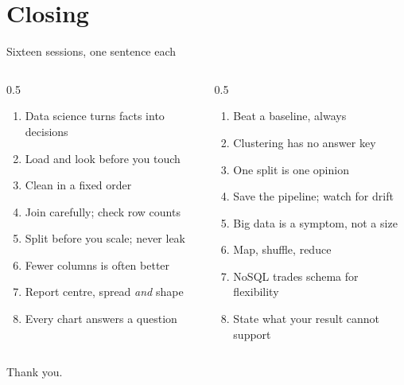 \documentclass[10pt,aspectratio=169]{beamer}
\begin{document}
\section*{Closing}

\begin{frame}{Sixteen sessions, one sentence each}
\begin{columns}[T]
\begin{column}{0.5\textwidth}
\begin{enumerate}\footnotesize
\item Data science turns facts into decisions
\item Load and look before you touch
\item Clean in a fixed order
\item Join carefully; check row counts
\item Split before you scale; never leak
\item Fewer columns is often better
\item Report centre, spread \emph{and} shape
\item Every chart answers a question
\end{enumerate}
\end{column}
\begin{column}{0.5\textwidth}
\begin{enumerate}\footnotesize
\setcounter{enumi}{8}
\item Beat a baseline, always
\item Clustering has no answer key
\item One split is one opinion
\item Save the pipeline; watch for drift
\item Big data is a symptom, not a size
\item Map, shuffle, reduce
\item NoSQL trades schema for flexibility
\item State what your result cannot support
\end{enumerate}
\end{column}
\end{columns}
\end{frame}

\begin{frame}[standout]
Thank you.
\end{frame}
\end{document}
